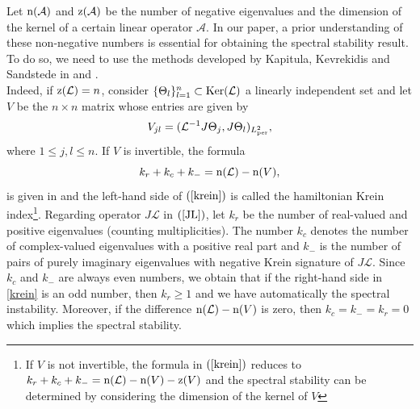 \documentclass[12pt,reqno,a4paper]{amsart} %
\numberwithin{equation}{section}
\numberwithin{figure}{section}
\begin{document}
\indent Let ${\rm n}(\mathcal{A})$ and ${\rm z}(\mathcal{A})$  be the number of negative eigenvalues and the dimension of the kernel of a certain linear operator $\mathcal{A}$. In our paper, a prior understanding of these non-negative numbers is essential for obtaining the spectral stability result. To do so, we need to use the methods developed by Kapitula, Kevrekidis and Sandstede in \cite{KapitulaKevrekidisSandstedeII} and \cite{KapitulaKevrekidisSandstedeI}.\\
\indent Indeed, if ${\rm z}(\mathcal{L})=n$, consider $\{\Theta_l\}_{l=1}^n \subset {\rm Ker}(\mathcal{L})$ a linearly independent set and let $V$ be the $n\times n$ matrix whose entries are given by 
\begin{equation}\label{V}
	V_{jl} = ( \mathcal{L}^{-1} J \Theta_j, J \Theta_l )_{{L}^2_{\rm per}},
\end{equation}
where $1\leq j,l\leq n$. If $V$ is invertible, the formula
\begin{equation}\label{krein}
	k_r + k_c + k_{-} = {\rm n}(\mathcal{L}) - {\rm n}(V),
\end{equation}
is given in \cite{KapitulaKevrekidisSandstedeII} and the left-hand side of $(\ref{krein})$ is called the hamiltonian Krein index\footnote{If $V$ is not invertible, the formula in $(\ref{krein})$ reduces to $k_r + k_c + k_{-} = {\rm n}(\mathcal{L}) - {\rm n}(V)- {\rm z}(V)$ and the spectral stability can be determined by considering the dimension of the kernel of $V$}. Regarding operator $J\mathcal{L}$ in $(\ref{JL})$, let $k_r$ be the number of real-valued and positive eigenvalues (counting multiplicities). The number $k_c$ denotes the number of complex-valued eigenvalues with a positive real part and $k_-$ is the number of pairs of purely imaginary eigenvalues with negative Krein signature of $J\mathcal{L}$. Since $k_c$ and $k_-$ are always even numbers, we obtain that if the right-hand side in \eqref{krein} is an odd number, then $k_r \geq 1$ and we have automatically the spectral instability. Moreover, if the difference ${\rm n}(\mathcal{L}) - {\rm n}(V)$ is zero, then $k_c = k_- = k_r = 0$ which implies the spectral stability.\\
\end{document}
